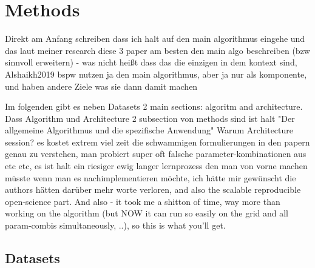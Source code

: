 \documentclass[11pt,
  paper=a4, 
  twoside,  %
  hidelinks,
  bibliography=totocnumbered,
	captions=tableheading,
	BCOR=10mm
]{scrreprt}
\theoremstyle{definition}
\begin{document}
\chapter{Methods}

Direkt am Anfang schreiben dass ich halt auf den main algorithmus eingehe und das laut meiner research diese 3 paper am besten den main algo beschreiben (bzw sinnvoll erweitern) - was nicht heißt dass das die einzigen in dem kontext sind, Alshaikh2019 bspw nutzen ja den main algorithmus, aber ja nur als komponente, und haben andere Ziele was sie dann damit machen

Im folgenden gibt es neben Datasets 2 main sections: algoritm and architecture. Dass Algorithm und Architecture 2 subsection von methods sind ist halt "Der allgemeine Algorithmus und die spezifische Anwendung" Warum Architecture session? es kostet extrem viel zeit die schwammigen formulierungen in den papern genau zu verstehen, man probiert super oft falsche parameter-kombinationen aus etc etc, es ist halt ein riesiger ewig langer lernprozess den man von vorne machen müsste wenn man es nachimplementieren möchte, ich hätte mir gewünscht die authors hätten darüber mehr worte verloren, and also the scalable reproducible open-science part. And also - it took me a shitton of time, way more than working on the algorithm (but NOW it can run so easily on the grid and all param-combis simultaneously, ..), so this is what you'll get.


\section{Datasets}

\end{document}
